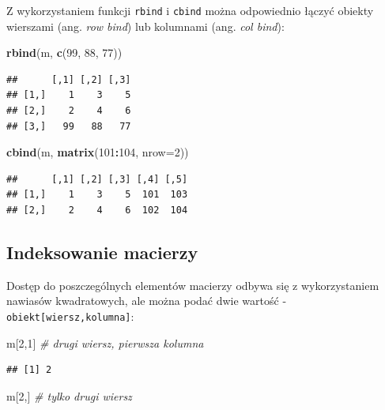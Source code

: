 \documentclass[]{book}
\newenvironment{Shaded}{\begin{snugshade}}{\end{snugshade}}
\newcommand{\KeywordTok}[1]{\textcolor[rgb]{0.13,0.29,0.53}{\textbf{#1}}}
\newcommand{\DataTypeTok}[1]{\textcolor[rgb]{0.13,0.29,0.53}{#1}}
\newcommand{\DecValTok}[1]{\textcolor[rgb]{0.00,0.00,0.81}{#1}}
\newcommand{\CommentTok}[1]{\textcolor[rgb]{0.56,0.35,0.01}{\textit{#1}}}
\newcommand{\OperatorTok}[1]{\textcolor[rgb]{0.81,0.36,0.00}{\textbf{#1}}}
\newcommand{\NormalTok}[1]{#1}
\begin{document}
Z wykorzystaniem funkcji \texttt{rbind} i \texttt{cbind} można
odpowiednio łączyć obiekty wierszami (ang. \emph{row bind}) lub
kolumnami (ang. \emph{col bind}):

\begin{Shaded}
\begin{Highlighting}[]
\KeywordTok{rbind}\NormalTok{(m, }\KeywordTok{c}\NormalTok{(}\DecValTok{99}\NormalTok{, }\DecValTok{88}\NormalTok{, }\DecValTok{77}\NormalTok{))}
\end{Highlighting}
\end{Shaded}

\begin{verbatim}
##      [,1] [,2] [,3]
## [1,]    1    3    5
## [2,]    2    4    6
## [3,]   99   88   77
\end{verbatim}

\begin{Shaded}
\begin{Highlighting}[]
\KeywordTok{cbind}\NormalTok{(m, }\KeywordTok{matrix}\NormalTok{(}\DecValTok{101}\OperatorTok{:}\DecValTok{104}\NormalTok{, }\DataTypeTok{nrow=}\DecValTok{2}\NormalTok{))}
\end{Highlighting}
\end{Shaded}

\begin{verbatim}
##      [,1] [,2] [,3] [,4] [,5]
## [1,]    1    3    5  101  103
## [2,]    2    4    6  102  104
\end{verbatim}

\subsection{Indeksowanie macierzy}\label{indeksowanie-macierzy}

Dostęp do poszczególnych elementów macierzy odbywa się z wykorzystaniem
nawiasów kwadratowych, ale można podać dwie wartość -
\texttt{obiekt{[}wiersz,kolumna{]}}:

\begin{Shaded}
\begin{Highlighting}[]
\NormalTok{m[}\DecValTok{2}\NormalTok{,}\DecValTok{1}\NormalTok{] }\CommentTok{# drugi wiersz, pierwsza kolumna}
\end{Highlighting}
\end{Shaded}

\begin{verbatim}
## [1] 2
\end{verbatim}

\begin{Shaded}
\begin{Highlighting}[]
\NormalTok{m[}\DecValTok{2}\NormalTok{,]  }\CommentTok{# tylko drugi wiersz}
\end{Highlighting}
\end{Shaded}
\end{document}
